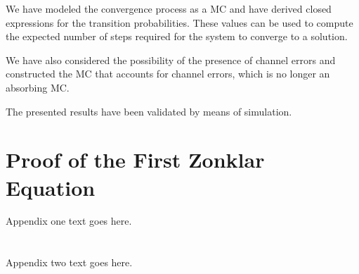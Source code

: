 \documentclass[journal]{IEEEtran}
\begin{document}
We have modeled the convergence process as a MC and have derived closed expressions for the transition probabilities.
These values can be used to compute the expected number of steps required for the system to converge to a solution.

We have also considered the possibility of the presence of channel errors and constructed the MC that accounts for channel errors, which is no longer an absorbing MC.

The presented results have been validated by means of simulation.






%


\appendices
\section{Proof of the First Zonklar Equation}
Appendix one text goes here.

\section{}
Appendix two text goes here.
\end{document}
